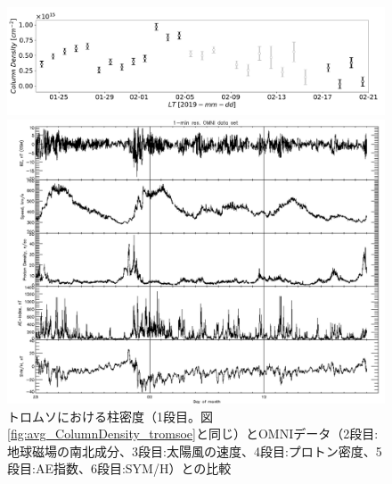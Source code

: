 \begin{figure}[htbp]
    \centering
    \begin{minipage}{\linewidth}
        \centering
        \includegraphics[width=\linewidth]{master_thesis_contents/master_thesis_fig/avg_ColumnDensity_tromsoe.pdf}
    \end{minipage}
    \begin{minipage}{\linewidth}
        \centering
        \includegraphics[width=\linewidth]{master_thesis_contents/master_thesis_fig/omni_tromsoe.pdf}
    \end{minipage}
    \caption{トロムソにおける柱密度（1段目。図\ref{fig:avg_ColumnDensity_tromsoe}と同じ）とOMNIデータ（2段目:地球磁場の南北成分、3段目:太陽風の速度、4段目:プロトン密度、5段目:AE指数、6段目:SYM/H）との比較}
    \label{fig:omni_mmcd_tromsoe}
\end{figure}
